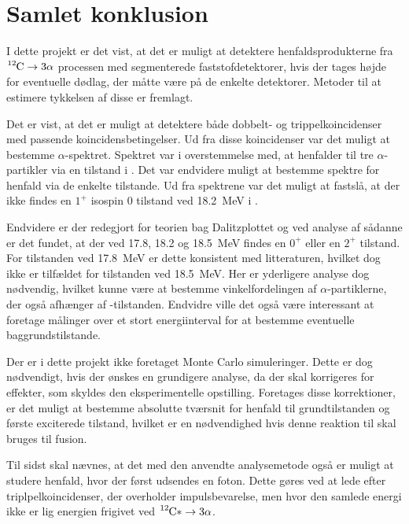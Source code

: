 \chapter{Samlet konklusion}
\label{cha:konklusion}

I dette projekt er det vist, at det er muligt at detektere henfaldsprodukterne fra $\Carb
\rightarrow 3\alpha$ processen med segmenterede faststofdetektorer, hvis der tages højde for
eventuelle dødlag, der måtte være på de enkelte detektorer. Metoder til at estimere tykkelsen af
disse er fremlagt.


Det er vist, at det er muligt at detektere både dobbelt- og trippelkoincidenser med passende
koincidensbetingelser. Ud fra disse koincidenser var det muligt at bestemme $\alpha$-spektret. Spektret
var i overstemmelse med, at \Carb henfalder til tre $\alpha$-partikler via en tilstand i \Be. Det var
endvidere muligt at bestemme spektre for henfald via de enkelte tilstande. Ud fra spektrene var det
muligt at fastslå, at der ikke findes en $1^{+}$ isospin 0 tilstand ved \SI{18.2}{\MeV} i \Carb.

Endvidere er der redegjort for teorien bag Dalitzplottet og ved analyse af sådanne er det fundet, at
der ved \num{17.8}, \num{18.2} og \SI{18.5}{\MeV} findes en $0^{+}$ eller en $2^{+}$ tilstand. For
tilstanden ved \SI{17.8}{\MeV} er dette konsistent med litteraturen, hvilket dog ikke er tilfældet
for tilstanden ved \SI{18.5}{\MeV}. Her er yderligere analyse dog nødvendig, hvilket kunne være at
bestemme vinkelfordelingen af $\alpha$-partiklerne, der også afhænger af \Carb-tilstanden. Endvidre ville
det også være interessant at foretage målinger over et stort energiinterval for at bestemme
eventuelle baggrundstilstande.

Der er i dette projekt ikke foretaget Monte Carlo simuleringer. Dette er dog nødvendigt, hvis der
ønskes en grundigere analyse, da der skal korrigeres for effekter, som skyldes den eksperimentelle
opstilling. Foretages disse korrektioner, er det muligt at bestemme absolutte tværsnit for henfald
til grundtilstanden og første exciterede tilstand, hvilket er en nødvendighed hvis denne reaktion
til skal bruges til fusion.  

Til sidst skal nævnes, at det med den anvendte analysemetode også er muligt at studere henfald, hvor
der først udsendes en foton. Dette gøres ved at lede efter triplpelkoincidenser, der overholder
impulsbevarelse, men hvor den samlede energi ikke er lig energien frigivet ved $\Carb* \rightarrow 3\alpha$.







